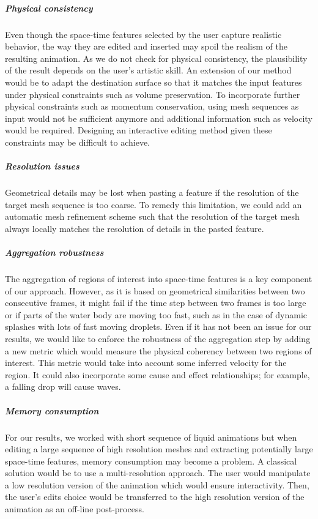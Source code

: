 \subparagraph{Physical consistency} 
Even though the space-time features selected by the user capture realistic behavior, the way they are edited and inserted may spoil the realism of the resulting animation. 
As we do not check for physical consistency, the plausibility of the result depends on the user's artistic skill. 
An extension of our method would be to adapt the destination surface so that it matches the input features under physical constraints such as volume preservation. 
To incorporate further physical constraints such as momentum conservation, using mesh sequences as input would not be sufficient anymore and additional information such as velocity would be required. 
Designing an interactive editing method given these constraints may be difficult to achieve.

\subparagraph{Resolution issues} 
Geometrical details may be lost when pasting a feature if the resolution of the target mesh sequence is too coarse. 
To remedy this limitation, we could add an automatic mesh refinement scheme such that the resolution of the target mesh always locally matches the resolution of details in the pasted feature.

\subparagraph{Aggregation robustness} 
The aggregation of regions of interest into space-time features is a key component of our approach. 
However, as it is based on geometrical similarities between two consecutive frames, it might fail if the time step between two frames is too large or if parts of the water body are moving too fast, such as in the case of dynamic splashes with lots of fast moving droplets. 
Even if it has not been an issue for our results, we would like to enforce the robustness of the aggregation step by adding a new metric which would measure the physical coherency between two regions of interest. 
This metric would take into account some inferred velocity for the region. It could also incorporate some cause and effect relationships; for example, a falling drop will cause waves. 

\subparagraph{Memory consumption} 
For our results, we worked with short sequence of liquid animations but when editing a large sequence of high resolution meshes and extracting potentially large space-time features, memory consumption may become a problem. 
A classical solution would be to use a multi-resolution approach.
The user would manipulate a low resolution version of the animation which would ensure interactivity. 
Then, the user's edits choice would be transferred to the high resolution version of the animation as an off-line post-process.

